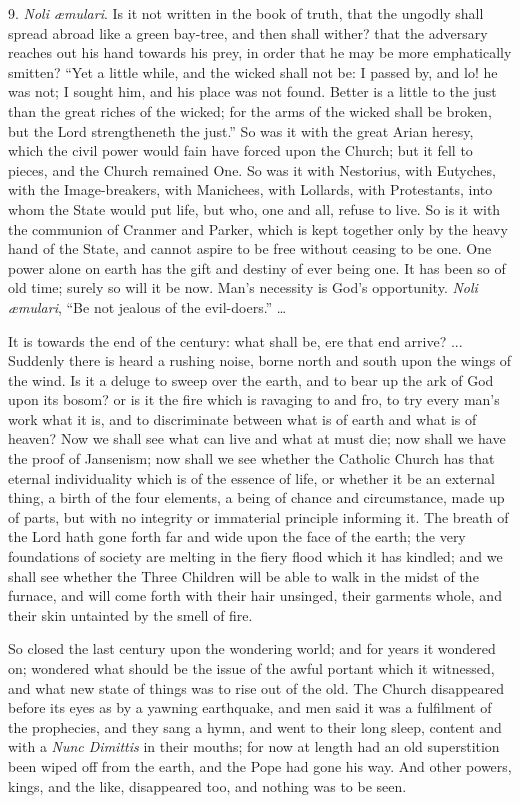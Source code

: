 9.
\emph{Noli æmulari}. Is it not written in the book of truth, that the
ungodly shall spread abroad like a green bay-tree, and then shall
wither? that the adversary reaches out his hand towards his prey, in
order that he may be more emphatically smitten? ``Yet a little
while, and the wicked shall not be: I passed by, and lo! he was not; I
sought him, and his place was not found. Better is a little to the
just than the great riches of the wicked; for the arms of the wicked
shall be broken, but the Lord strengtheneth the just.'' So was it
with the great Arian heresy, which the civil power would fain have
forced upon the Church; but it fell to pieces, and the Church remained
One. So was it with Nestorius, with Eutyches, with the Image-breakers,
with Manichees, with Lollards, with Protestants, into whom the State
would put life, but who, one and all, refuse to live. So is it with
the communion of Cranmer and Parker, which is kept together only by
the heavy hand of the State, and cannot aspire to be free without
ceasing to be one. One power alone on earth has the gift and destiny
of ever being one. It has been so of old time; surely so will it be
now. Man's necessity is God's opportunity. \emph{Noli æmulari},
``Be not jealous of the evil-doers.'' …

It is towards the end of the century: what shall be, ere that end
arrive? ... Suddenly there is heard a rushing noise, borne north and
south upon the wings of the wind. Is it a deluge to sweep over the
earth, and to bear up the ark of God upon its bosom? or is it the fire
which is ravaging to and fro, to try every man's work what it is, and
to discriminate between what is of earth and what is of heaven? Now we
shall see what can live and what at must die; now shall we have the
proof of Jansenism; now shall we see whether the Catholic Church has
that eternal individuality which is of the essence of life, or whether
it be an external thing, a birth of the four elements, a being of
chance and circumstance, made up of parts, but with no integrity or
immaterial principle informing it. The breath of the Lord hath gone
forth far and wide upon the face of the earth; the very foundations of
society are melting in the fiery flood which it has kindled; and we
shall see whether the Three Children will be able to walk in the midst
of the furnace, and will come forth with their hair unsinged, their
garments whole, and their skin untainted by the smell of fire.

So closed the last century upon the wondering world; and for years
it wondered on; wondered what should be the issue of the awful portant
which it witnessed, and what new state of things was to rise out of
the old. The Church disappeared before its eyes as by a yawning
earthquake, and men said it was a fulfilment of the prophecies, and
they sang a hymn, and went to their long sleep, content and with a \emph{Nunc
Dimittis} in their mouths; for now at length had an old
superstition been wiped off from the earth, and the Pope had gone his
way. And other powers, kings, and the like, disappeared too, and
nothing was to be seen.

